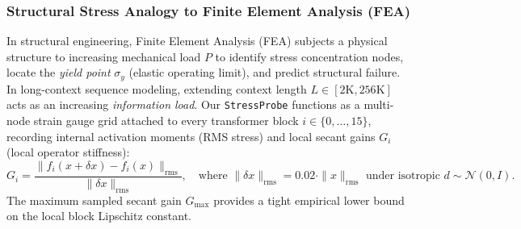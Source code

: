 \documentclass{article} %
\begin{document}
\subsubsection{Structural Stress Analogy to Finite Element Analysis (FEA)}
In structural engineering, Finite Element Analysis (FEA) subjects a physical structure to increasing mechanical load $P$ to identify stress concentration nodes, locate the \emph{yield point} $\sigma_y$ (elastic operating limit), and predict structural failure. In long-context sequence modeling, extending context length $L \in [2\mathrm{K}, 256\mathrm{K}]$ acts as an increasing \emph{information load}. Our \texttt{StressProbe} functions as a multi-node strain gauge grid attached to every transformer block $i \in \{0, \dots, 15\}$, recording internal activation moments (RMS stress) and local secant gains $G_i$ (local operator stiffness):
\begin{equation}
    G_i = \frac{\|f_i(x + \delta x) - f_i(x)\|_{\mathrm{rms}}}{\|\delta x\|_{\mathrm{rms}}}, \quad \text{where } \|\delta x\|_{\mathrm{rms}} = 0.02 \cdot \|x\|_{\mathrm{rms}} \text{ under isotropic } d \sim \mathcal{N}(0, I).
\end{equation}
The maximum sampled secant gain $G_{\mathrm{max}}$ provides a tight empirical lower bound on the local block Lipschitz constant.
\end{document}
